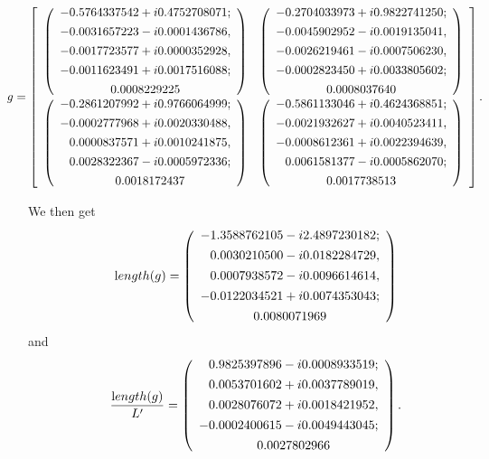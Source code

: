 \begin{small}
$$ \hskip-18pt
g = \left[\begin{array}{cc}
  \left(\begin{array}{c}
    -0.5764337542 + i 0.4752708071;\\[4pt]
    -0.0031657223 - i 0.0001436786,\\[4pt]
    -0.0017723577 + i 0.0000352928,\\[4pt]
    -0.0011623491 + i 0.0017516088;\\[4pt]
    0.0008229225
  \end{array}\right)
 &
  \left(\begin{array}{c}
    -0.2704033973 + i 0.9822741250;\\[4pt]
    -0.0045902952 - i 0.0019135041,\\[4pt]
    -0.0026219461 - i 0.0007506230,\\[4pt]
    -0.0002823450 + i 0.0033805602;\\[4pt]
    0.0008037640
  \end{array}\right)
 \\[9pt]
  \left(\begin{array}{c}
    -0.2861207992 + i 0.9766064999;\\[4pt]
    -0.0002777968 + i 0.0020330488,\\[4pt]
   \phantom{-} 0.0000837571 + i 0.0010241875,\\[4pt]
   \phantom{-} 0.0028322367 - i 0.0005972336;\\[4pt]
   \phantom{-} 0.0018172437
  \end{array}\right)
 &
  \left(\begin{array}{c}
    -0.5861133046 + i 0.4624368851;\\[4pt]
    -0.0021932627 + i 0.0040523411,\\[4pt]
    -0.0008612361 + i 0.0022394639,\\[4pt]
   \phantom{-} 0.0061581377 - i 0.0005862070;\\[4pt]
    0.0017738513
  \end{array}\right)
\end{array}\right].
$$
\end{small}
We then get
$$
{\textrm length}(g) = \left(\begin{array}{c}
    -1.3588762105 - i 2.4897230182;\\[4pt]
  \phantom{-}  0.0030210500 - i 0.0182284729,\\[4pt]
   \phantom{-} 0.0007938572 - i 0.0096614614,\\[4pt]
    -0.0122034521 + i 0.0074353043;\\[4pt]
    0.0080071969
  \end{array}\right)
$$
and
$$
{{\textrm length}(g) \over L'} =
  \left(\begin{array}{c}
   \phantom{-} 0.9825397896 - i 0.0008933519;\\[4pt]
   \phantom{-} 0.0053701602 + i 0.0037789019,\\[4pt]
   \phantom{-} 0.0028076072 + i 0.0018421952,\\[4pt]
    -0.0002400615 - i 0.0049443045;\\[4pt]
   \phantom{-} 0.0027802966
  \end{array}\right).
$$


